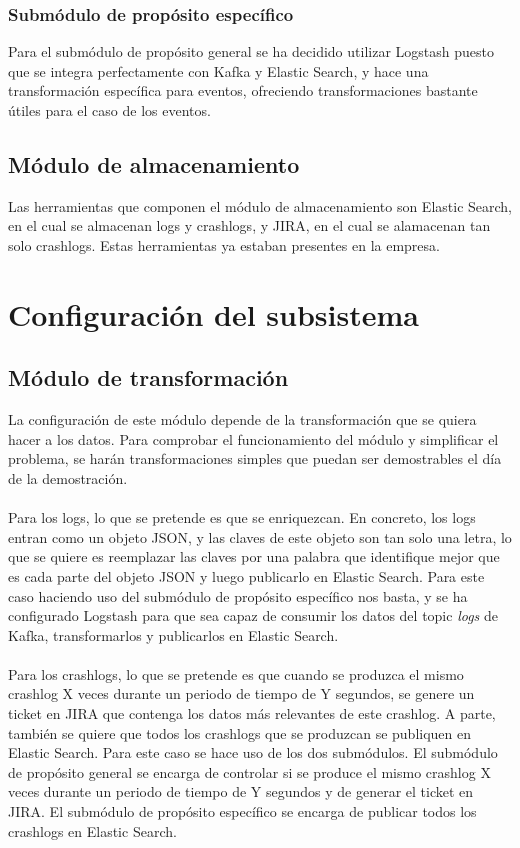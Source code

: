 \subsubsection{Submódulo de propósito específico}
Para el submódulo de propósito general se ha decidido utilizar Logstash puesto que se integra perfectamente con Kafka y Elastic Search, y hace una transformación específica para eventos, ofreciendo transformaciones bastante útiles para el caso de los eventos.

\subsection{Módulo de almacenamiento}
Las herramientas que componen el módulo de almacenamiento son Elastic Search, en el cual se almacenan logs y crashlogs, y JIRA, en el cual se alamacenan tan solo crashlogs. Estas herramientas ya estaban presentes en la empresa.

\section{Configuración del subsistema}

\subsection{Módulo de transformación}
La configuración de este módulo depende de la transformación que se quiera hacer a los datos. Para comprobar el funcionamiento del módulo y simplificar el problema, se harán transformaciones simples que puedan ser demostrables el día de la demostración.
\\\\
Para los logs, lo que se pretende es que se enriquezcan. En concreto, los logs entran como un objeto JSON, y las claves de este objeto son tan solo una letra, lo que se quiere es reemplazar las claves por una palabra que identifique mejor que es cada parte del objeto JSON y luego publicarlo en Elastic Search. Para este caso haciendo uso del submódulo de propósito específico nos basta, y se ha configurado Logstash para que sea capaz de consumir los datos del topic \textit{logs} de Kafka, transformarlos y publicarlos en Elastic Search. 
\\\\
Para los crashlogs, lo que se pretende es que cuando se produzca el mismo crashlog X veces durante un periodo de tiempo de Y segundos, se genere un ticket en JIRA que contenga los datos más relevantes de este crashlog. A parte, también se quiere que todos los crashlogs que se produzcan se publiquen en Elastic Search. Para este caso se hace uso de los dos submódulos. El submódulo de propósito general se encarga de controlar si se produce el mismo crashlog X veces durante un periodo de tiempo de Y segundos y de generar el ticket en JIRA. El submódulo de propósito específico se encarga de publicar todos los crashlogs en Elastic Search.

